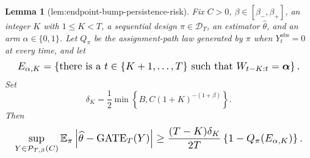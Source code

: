 \documentclass{article}
\newtheorem{lemma}{Lemma}
\begin{document}
\begin{lemma}[lem:endpoint-bump-persistence-risk]\label{lem:endpoint-bump-persistence-risk}
Fix \(C>0\), \(\beta\in[\beta_-,\beta_+]\), an integer \(K\) with \(1\le K<T\), a sequential design \(\pi\in\mathcal D_T\), an estimator \(\widehat\theta\), and an arm \(\alpha\in\{0,1\}\). Let \(Q_\pi\) be the assignment-path law generated by \(\pi\) when \(Y_t^{\mathrm{obs}}=0\) at every time, and let
\[
\makebox[\linewidth][c]{\resizebox{0.98\linewidth}{!}{\leavevmode\par\noindent \makebox[\linewidth][c]{\resizebox{0.98\linewidth}{!}{\(\displaystyle \displaystyle E_{\alpha,K}=\left\{\text{there is a }t\in\{K+1,\ldots,T\}\text{ such that }W_{t-K:t}=\boldsymbol\alpha\right\}.\)}}\par\noindent}}
\]
Set
\[
\delta_K=\frac12\min\left\{B,C(1+K)^{-(1+\beta)}\right\}.
\]
Then
\[
\makebox[\linewidth][c]{\resizebox{0.98\linewidth}{!}{\(\displaystyle \sup_{Y\in\mathcal P_{T,\beta}(C)}\mathbb E_\pi\left|\widehat\theta-\operatorname{GATE}_T(Y)\right|
\ge
\frac{(T-K)\delta_K}{2T}\left\{1-Q_\pi(E_{\alpha,K})\right\}.\)}}
\]
\end{lemma}
\end{document}
